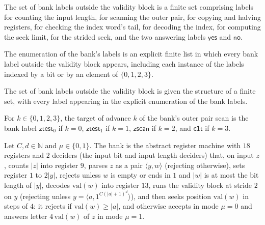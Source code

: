 \begin{definition}
\label{Complexity.EPadBX}
\leanok
The set of bank labels outside the validity block is a finite set comprising labels for counting
the input length, for scanning the outer pair, for copying and halving registers, for checking
the index word's tail, for decoding the index, for computing the seek limit, for the strided
seek, and the two answering labels $\mathsf{yes}$ and $\mathsf{no}$.
\end{definition}

\begin{definition}
\label{Complexity.epadBXAll}
\leanok
{}
The enumeration of the bank's labels is an explicit finite list in which every bank label
outside the validity block appears, including each instance of the labels indexed by a bit or by
an element of $\{0,1,2,3\}$.
\end{definition}

\begin{definition}
\label{Complexity.epadBXFintype}
\leanok
{}
The set of bank labels outside the validity block is given the structure of a finite set, with
every label appearing in the explicit enumeration of the bank labels.
\end{definition}

\begin{definition}
\label{Complexity.epadZEnd}
\leanok
{}
For $k \in \{0,1,2,3\}$, the target of advance $k$ of the bank's outer pair scan is the bank
label $\mathsf{ztest}_0$ if $k = 0$, $\mathsf{ztest}_1$ if $k = 1$, $\mathsf{zscan}$ if $k = 2$,
and $\mathsf{c1t}$ if $k = 3$.
\end{definition}

\begin{definition}
\label{Complexity.epadBA}
\leanok
{}
Let $C, d \in \mathbb{N}$ and $\mu \in \{0,1\}$. The bank is the abstract register machine with
$18$ registers and $2$ deciders (the input bit and input length deciders) that, on input $z$,
counts $|z|$ into register $9$, parses $z$ as a pair $\langle y, w\rangle$ (rejecting otherwise),
sets register $1$ to $2|y|$, rejects unless $w$ is empty or ends in $1$ and $|w|$ is at most the
bit length of $|y|$, decodes $\mathrm{val}(w)$ into register $13$, runs the validity block at
stride $2$ on $y$ (rejecting unless $y = \langle a, 1^{C(|a|+1)^d}\rangle$), and then seeks
position $\mathrm{val}(w)$ in steps of $4$: it rejects if $\mathrm{val}(w) \ge |a|$, and otherwise
accepts in mode $\mu = 0$ and answers letter $4\,\mathrm{val}(w)$ of $z$ in mode $\mu = 1$.
\end{definition}


